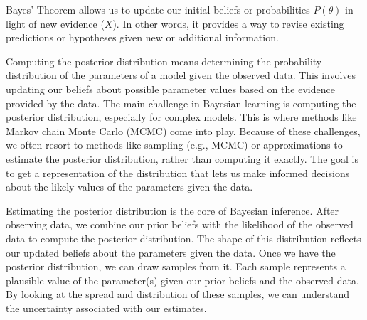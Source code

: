 \documentclass[letterpaper,10pt,english]{jupyterBook}
\begin{document}
\sphinxAtStartPar
Bayes’ Theorem allows us to update our initial beliefs or probabilities \(P(\theta)\) in light of new evidence (\(X\)). In other words, it provides a way to revise existing predictions or hypotheses given new or additional information.

\sphinxAtStartPar
{}

\sphinxAtStartPar
Computing the posterior distribution means determining the probability distribution of the parameters of a model given the observed data. This involves updating our beliefs about possible parameter values based on the evidence provided by the data. The main challenge in Bayesian learning is computing the posterior distribution, especially for complex models. This is where methods like Markov chain Monte Carlo (MCMC) come into play. Because of these challenges, we often resort to methods like sampling (e.g., MCMC) or approximations to estimate the posterior distribution, rather than computing it exactly. The goal is to get a representation of the distribution that lets us make informed decisions about the likely values of the parameters given the data.

\sphinxAtStartPar
Estimating the posterior distribution is the core of Bayesian inference. After observing data, we combine our prior beliefs with the likelihood of the observed data to compute the posterior distribution. The shape of this distribution reflects our updated beliefs about the parameters given the data. Once we have the posterior distribution, we can draw samples from it. Each sample represents a plausible value of the parameter(s) given our prior beliefs and the observed data. By looking at the spread and distribution of these samples, we can understand the uncertainty associated with our estimates.
\end{document}
